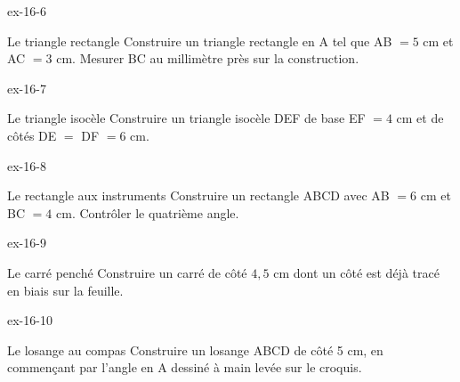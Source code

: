 \begin{blocLivre}{ex-16-6}\begin{exercice}[2]{Le triangle rectangle}
Construire un triangle rectangle en A tel que AB $=5$ cm et AC $=3$ cm. Mesurer BC au millimètre près sur la construction.
\label{fig-ex-16-6}
\end{exercice}\end{blocLivre}
\begin{blocLivre}{ex-16-7}\begin{exercice}[2]{Le triangle isocèle}
Construire un triangle isocèle DEF de base EF $=4$ cm et de côtés DE $=$ DF $=6$ cm.
\label{fig-ex-16-7}
\end{exercice}\end{blocLivre}
\begin{blocLivre}{ex-16-8}\begin{exercice}[2]{Le rectangle aux instruments}
Construire un rectangle ABCD avec AB $=6$ cm et BC $=4$ cm. Contrôler le quatrième angle.
\label{fig-ex-16-8}
\end{exercice}\end{blocLivre}
\begin{blocLivre}{ex-16-9}\begin{exercice}[2]{Le carré penché}
Construire un carré de côté $4{,}5$ cm dont un côté est déjà tracé en biais sur la feuille.
\label{fig-ex-16-9}
\end{exercice}\end{blocLivre}
\begin{blocLivre}{ex-16-10}\begin{exercice}[2]{Le losange au compas}
Construire un losange ABCD de côté 5 cm, en commençant par l’angle en A dessiné à main levée sur le croquis.
\label{fig-ex-16-10}
\end{exercice}\end{blocLivre}


